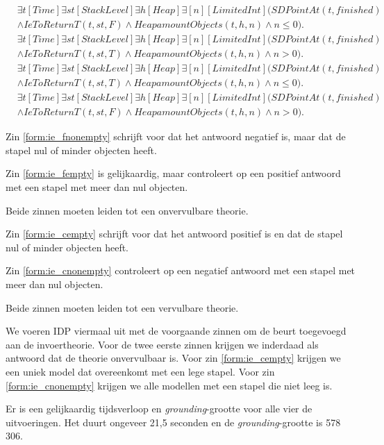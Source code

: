 \begin{align}
	\nonumber&\exists{t}[Time]\exists{st}[StackLevel]\exists{h}[Heap]\exists[n][LimitedInt](SDPointAt(t, finished) \\ &\land IeToReturnT(t, st, F) \land HeapamountObjects(t, h, n) \land n \leq 0).\label{form:ie_fnonempty} \\
	\nonumber&\exists{t}[Time]\exists{st}[StackLevel]\exists{h}[Heap]\exists[n][LimitedInt](SDPointAt(t, finished) \\ &\land IeToReturnT(t, st, T) \land HeapamountObjects(t, h, n) \land n > 0).\label{form:ie_fempty} \\
	\nonumber&\exists{t}[Time]\exists{st}[StackLevel]\exists{h}[Heap]\exists[n][LimitedInt](SDPointAt(t, finished) \\ &\land IeToReturnT(t, st, T) \land HeapamountObjects(t, h, n) \land n \leq 0).\label{form:ie_cempty} \\
	\nonumber&\exists{t}[Time]\exists{st}[StackLevel]\exists{h}[Heap]\exists[n][LimitedInt](SDPointAt(t, finished) \\ &\land IeToReturnT(t, st, F) \land HeapamountObjects(t, h, n) \land n > 0).\label{form:ie_cnonempty}
\end{align}

Zin \ref{form:ie_fnonempty} schrijft voor dat het antwoord negatief is, maar dat de stapel nul of minder objecten heeft.

Zin \ref{form:ie_fempty} is gelijkaardig, maar controleert op een positief antwoord met een stapel met meer dan nul objecten.

Beide zinnen moeten leiden tot een onvervulbare theorie.

Zin \ref{form:ie_cempty} schrijft voor dat het antwoord positief is en dat de stapel nul of minder objecten heeft.

Zin \ref{form:ie_cnonempty} controleert op een negatief antwoord met een stapel met meer dan nul objecten.

Beide zinnen moeten leiden tot een vervulbare theorie.

We voeren IDP viermaal uit met de voorgaande zinnen om de beurt toegevoegd aan de invoertheorie. Voor de twee eerste zinnen krijgen we inderdaad als antwoord dat de theorie onvervulbaar is. Voor zin \ref{form:ie_cempty} krijgen we een uniek model dat overeenkomt met een lege stapel. Voor zin \ref{form:ie_cnonempty} krijgen we alle modellen met een stapel die niet leeg is.

Er is een gelijkaardig tijdsverloop en \textit{grounding}-grootte voor alle vier de uitvoeringen. Het duurt ongeveer 21,5 seconden en de \textit{grounding}-grootte is 578 306.

